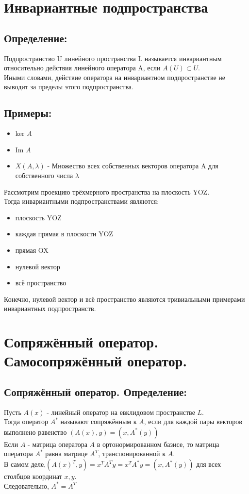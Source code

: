 \documentclass[12pt]{article}
\begin{document}
\section{Инвариантные подпространства}
\subsection{Определение:}

Подпространство U линейного пространства L называется инвариантным относительно действия линейного оператора A, если $A(U)  \subset  U$.\\
Иными словами, действие оператора на инвариантном подпространстве не выводит за пределы этого подпространства.

\subsection{Примеры:}
\begin{itemize}
    \item ker $A$
    \item Im $A$
    \item $X(A,\lambda)$ - Множество всех собственных векторов оператора A для собственного числа $\lambda$
\end{itemize}
Рассмотрим проекцию трёхмерного пространства на плоскость YOZ.\\
Тогда инвариантными подпространствами являются:
\begin{itemize}
    \item плоскость YOZ
    \item каждая прямая в плоскости YOZ
    \item прямая OX
    \item нулевой вектор
    \item всё пространство
\end{itemize}
Конечно, нулевой вектор и всё пространство являются тривиальными примерами инвариантных подпространств.

\section{Сопряжённый оператор. Самосопряжённый оператор.}
\subsection{Сопряжённый оператор. Определение:}
Пусть $A(x)$ - линейный оператор на евклидовом пространстве $L$.\\
Тогда оператор $A^*$ называют сопряжённым к $A$, если для каждой пары векторов выполнено равенство $(A(x), y) = (x, A^*(y))$ \\
Если $A$ - матрица оператора $A$  в ортонормированном базисе, то матрица оператора $A^*$ равна матрице $A^T$, транспонированной к $A$.\\
В самом деле,$(A(x)^{T}, y) = x^TA^Ty = x^TA^*y = (x, A^*(y))$ для всех столбцов координат $x, y$. \\
Следовательно, $A^* = A^T$
\end{document}
